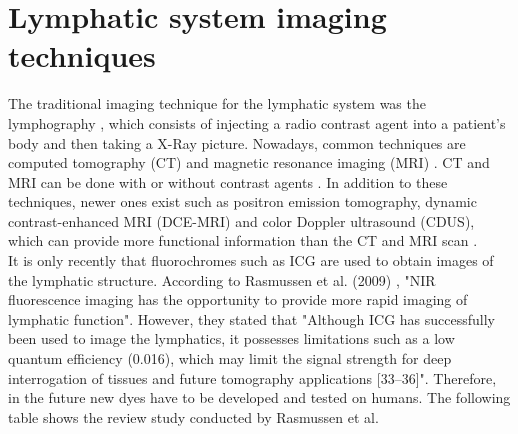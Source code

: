 \section{Lymphatic system imaging techniques}
The traditional imaging technique for the lymphatic system was the lymphography \cite{guermazi_lymphography:_2003}, which consists of injecting a radio contrast agent into a patient's body and then taking a X-Ray picture.  Nowadays, common techniques are computed tomography (CT) and magnetic resonance imaging (MRI) \cite{guermazi_lymphography:_2003,reinhardt_metastatic_2001}. CT and MRI can be done with or without contrast agents \cite{luciani_lymph_2006}. In addition to these techniques, newer ones exist such as positron emission tomography, dynamic contrast-enhanced MRI (DCE-MRI) and color Doppler ultrasound (CDUS), which can provide more functional information than the CT and MRI scan \cite{barrett_imaging_2006}. \\

It is only recently that fluorochromes such as ICG are used to obtain images of the lymphatic structure. According to Rasmussen et al. (2009) \cite{rasmussen_lymphatic_2009}, "NIR fluorescence imaging has the opportunity to provide more rapid imaging of lymphatic function". However, they stated that "Although ICG has successfully been used to image the lymphatics, it possesses limitations such as a low quantum efficiency (0.016), which may limit the signal strength for deep interrogation of tissues and future tomography applications [33–36]". Therefore, in the future new dyes have to be developed and tested on humans. The following table shows the review study conducted by Rasmussen et al. \cite{rasmussen_lymphatic_2009}

